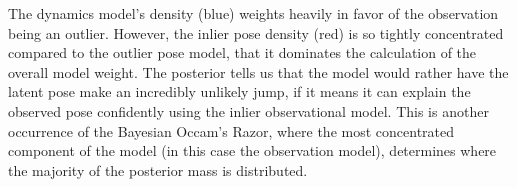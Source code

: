 The dynamics model's density (blue) weights heavily in favor of the observation being an outlier.
However, the inlier pose density (red) is so tightly concentrated compared to the outlier pose model, that it dominates the calculation of the overall model weight.
The posterior tells us that the model would rather have the latent pose make an incredibly unlikely jump, if it means it can explain the observed pose confidently using the inlier observational model.
This is another occurrence of the Bayesian Occam's Razor, where the most concentrated component of the model (in this case the observation model), determines where the majority of the posterior mass is distributed.

\raggedbottom

\pagebreak

\flushbottom

